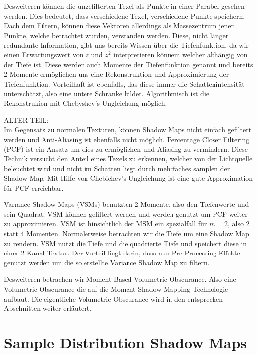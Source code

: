 \documentclass[runningheaders,a4paper]{llncs}
\begin{document}
Desweiteren können die ungefilterten Texel als Punkte in einer Parabel gesehen werden. Dies bedeutet, dass verschiedene Texel, verschiedene Punkte speichern. Dach dem Filtern, können diese Vektoren allerdings als Massezentrum jener Punkte, welche betrachtet wurden, verstanden werden. Diese, nicht länger redundante Information, gibt uns bereits Wissen über die Tiefenfunktion, da wir einen Erwartungswert von $z$ und $z^2$ interpretieren könnem welcher abhängig von der Tiefe ist. Diese werden auch Momente der Tiefenfunktion genannt und bereits 2 Momente ermöglichen uns eine Rekonstruktion und Approximierung der Tiefenfunktion. Vorteilhaft ist ebenfalls, das diese immer die Schattenintensität unterschätzt, also eine untere Schranke bildet. Algorithmisch ist die Rekonstrukion mit Chebyshev's Ungleichung möglich. \cite{donnelly2006variance}

ALTER TEIL:\\
Im Gegensatz zu normalen Texturen, können Shadow Maps nicht einfach gefiltert werden und Anti-Aliasing ist ebenfalls nicht möglich. 
Percentage Closer Filtering (PCF) ist ein Ansatz um dies zu ermöglichen und Aliasing zu vermindern. Diese Technik versucht den Anteil eines Texels zu erkennen, welcher von der Lichtquelle beleuchtet wird und nicht im Schatten liegt durch mehrfaches samplen der Shadow Map. 
Mit Hilfe von Chebichev's Ungleichung ist eine gute Approximation für PCF erreichbar. \cite{reeves1987rendering}

Variance Shadow Maps (VSMs) benutzten 2 Momente, also den Tiefenwerte und sein Quadrat.
VSM können gefiltert werden und werden genutzt um PCF weiter zu approximieren.
VSM ist hinsichtlich der MSM ein spezialfall für $m = 2$, also 2 statt 4 Momenten. Normalerweise betrachten wir die Tiefe um eine Shadow Map zu rendern. VSM nutzt die Tiefe und die quadrierte Tiefe und speichert diese in einer 2-Kanal Textur. Der Vorteil liegt darin, dass nun Pre-Processing Effekte genutzt werden um die so erstellte Variance Shadow Map zu filtern. \cite{donnelly2006variance}

Desweiteren betrachen wir Moment Based Volumetric Obscurance. Also eine Volumetric Obscurance die auf die Moment Shadow Mapping Technologie aufbaut. Die eigentliche Volumetric Obscurance wird in den entsprechen Abschnitten weiter erläutert.

\section{Sample Distribution Shadow Maps}
\end{document}
